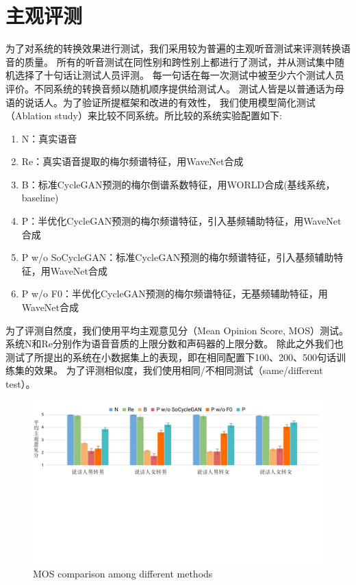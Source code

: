 \begin{table}
\label{tab:mse}
\end{table}  

\section{主观评测}
为了对系统的转换效果进行测试，我们采用较为普遍的主观听音测试来评测转换语音的质量。
所有的听音测试在同性别和跨性别上都进行了测试，并从测试集中随机选择了十句话让测试人员评测。
每一句话在每一次测试中被至少六个测试人员评价。不同系统的转换音频以随机顺序提供给测试人。
测试人皆是以普通话为母语的说话人。为了验证所提框架和改进的有效性，
我们使用模型简化测试（Ablation study）来比较不同系统。所比较的系统实验配置如下:

\begin{enumerate}
    \item N：真实语音
    \item Re：真实语音提取的梅尔频谱特征，用WaveNet合成
    \item B：标准CycleGAN预测的梅尔倒谱系数特征，用WORLD合成(基线系统，baseline)
    \item P：半优化CycleGAN预测的梅尔频谱特征，引入基频辅助特征，用WaveNet合成
    \item P w/o SoCycleGAN：标准CycleGAN预测的梅尔频谱特征，引入基频辅助特征，用WaveNet合成
    \item P w/o F0：半优化CycleGAN预测的梅尔频谱特征，无基频辅助特征，用WaveNet合成
\end{enumerate}

为了评测自然度，我们使用平均主观意见分（Mean Opinion Score, MOS）测试。
系统N和Re分别作为语音音质的上限分数和声码器的上限分数。
除此之外我们也测试了所提出的系统在小数据集上的表现，即在相同配置下100、200、500句话训练集的效果。
为了评测相似度，我们使用相同/不相同测试（same/different test）。

\begin{figure}[!htp]
    \centering
    \includegraphics[width=13cm,trim=0 280 0 0,clip]{figure/4_mos.png}
    {MOS comparison among different methods}
    \label{fig:mos}
\end{figure}

